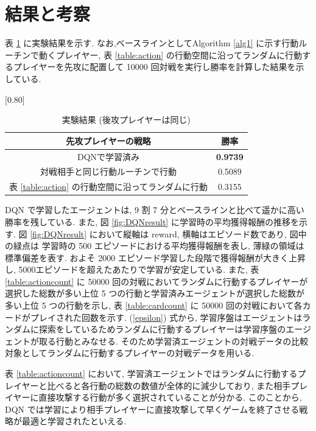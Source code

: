\documentclass[twocolumn]{jarticle}
\begin{document}
\section{結果と考察}
表 \ref{table:result} に実験結果を示す. なお,ベースラインとしてAlgorithm \ref{alg1} に示す行動ルーチンで動くプレイヤー, 表 \ref{table:action} の行動空間に沿ってランダムに行動するプレイヤーを先攻に配置して 10000 回対戦を実行し勝率を計算した結果を示している.\par 
\begin{table}[t]
  \centering
  \caption{実験結果 (後攻プレイヤーは同じ)}
  \vspace{-0.3cm}
  \label{table:result}
  \scalebox{0.80}[0.80]{
    \begin{tabular}{|c|c|}
      \hline
      先攻プレイヤーの戦略 & 勝率 \\ \hline \hline
      DQNで学習済み & \textbf{0.9739} \\ \hline
      対戦相手と同じ行動ルーチンで行動 & 0.5089 \\ \hline     
      表 \ref{table:action} の行動空間に沿ってランダムに行動 & 0.3155 \\ \hline

      \end{tabular}
  }
  \end{table}
  DQN で学習したエージェントは, 9 割 7 分とベースラインと比べて遥かに高い勝率を残している. また,  図 \ref{fig:DQNresult} に学習時の平均獲得報酬の推移を示す. 図 \ref{fig:DQNresult}  において縦軸は reward, 横軸はエピソード数であり, 図中の緑点は 学習時の 500 エピソードにおける平均獲得報酬を表し, 薄緑の領域は標準偏差を表す.
  およそ 2000 エピソード学習した段階で獲得報酬が大きく上昇し, 5000エピソードを超えたあたりで学習が安定している. また,  表 \ref{table:actioncount} に 50000 回の対戦においてランダムに行動するプレイヤーが選択した総数が多い上位 5 つの行動と学習済みエージェントが選択した総数が多い上位 5 つの行動を示し, 表 \ref{table:cardcount} に 50000 回の対戦において各カードがプレイされた回数を示す. 
   (\ref{epsilon}) 式から, 学習序盤はエージェントはランダムに探索をしているためランダムに行動するプレイヤーは学習序盤のエージェントが取る行動とみなせる. そのため学習済エージェントの対戦データの比較対象としてランダムに行動するプレイヤーの対戦データを用いる.
  \par
  表 \ref{table:actioncount} において, 学習済エージェントではランダムに行動するプレイヤーと比べると各行動の総数の数値が全体的に減少しており, また相手プレイヤーに直接攻撃する行動が多く選択されていることが分かる. このことから, DQN では学習により相手プレイヤーに直接攻撃して早くゲームを終了させる戦略が最適と学習されたといえる. 
\end{document}
